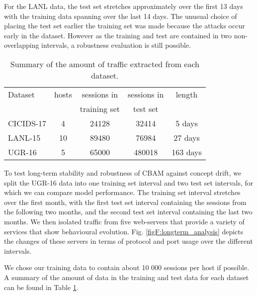 For the LANL data, the test set stretches approximately over the first 13 days with the training data spanning over the last 14 days. The unusual choice of placing the test set earlier the training set was made because the attacks occur early in the dataset. However as the training and test are contained in two non-overlapping intervals, a robustness evaluation is still possible.


\begin{table}[ht]
\centering
\begin{tabular}{l|cccc}
\hline
Dataset&hosts&sessions in&sessions in&length\\
&&training set&test set&\\[0.2cm]
\hline
CICIDS-17&4&24128&32414&5 days\\[0.2cm]
LANL-15&10&89480&76984&27 days\\[0.2cm]
UGR-16&5&65000&480018&163 days\\
\hline
\end{tabular}
\vspace{2pt}
\caption{Summary of the amount of traffic extracted from each dataset.}\label{tabF:Datasets}
\end{table}

To test long-term stability and robustness of CBAM against concept drift, 
we split the UGR-16 data into one training set interval and two test set intervals, for which we can compare model performance. 
The training set interval stretches over the first month, with the first test set interval containing the sessions from the following two months, and the second test set interval containing the last two months.
We then isolated traffic from five web-servers that provide a variety of services that show behavioural evolution. Fig. \ref{figF:longterm_analysis} depicts the changes of these servers in terms of protocol and port usage over the different intervals.

We chose our training data to contain about 10 000 sessions per host if possible. A summary of the amount of data in the training and test data for each dataset can be found in Table \ref{tabF:Datasets}.

